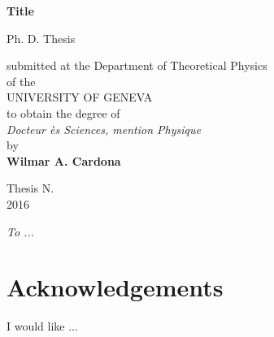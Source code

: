 \documentclass[12pt]{report}
\date{}
\begin{document}
\renewcommand{\figurename}{\textbf{Fig.}}
\renewcommand{\tablename}{\textbf{Tab.}}

\thispagestyle{empty}
\begin{center}  

\Large  \textbf{Title} \\
  
\vspace{4cm}  

\large Ph. D. Thesis

\vspace{4cm}

submitted at the Department of Theoretical Physics \\

of the \\

UNIVERSITY OF GENEVA\\

to obtain the degree of \\

\textit{Docteur ès Sciences, mention Physique}\\

by\\

\large \textbf{Wilmar A. Cardona}\\  

\vspace{4cm} 

\large Thesis N. \\  
\normalsize 2016  

\end{center}  

\newpage  
{}
  
  
\vspace{6cm}  
\begin{center}

\large \textit{To ...}
\normalsize

\end{center}
  
\newpage  

\chapter*{Acknowledgements} 

\vspace{3mm}

I would like ...
  
\newpage  
\end{document}
